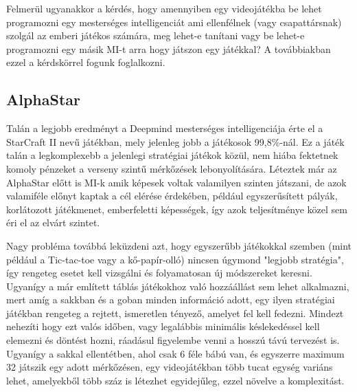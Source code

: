 Felmerül ugyanakkor a kérdés, hogy amennyiben egy videojátékba be lehet programozni egy mesterséges intelligenciát ami ellenfélnek (vagy csapattársnak) szolgál az emberi játékos számára, meg lehet-e tanítani vagy be lehet-e programozni egy másik MI-t arra hogy játszon egy játékkal? A továbbiakban ezzel a kérdskörrel fogunk foglalkozni.


\subsection{AlphaStar}
Talán a legjobb eredményt a Deepmind mesterséges intelligenciája érte el a StarCraft II nevű játékban, mely jelenleg jobb a játékosok 99,8\%-nál. 
Ez a játék talán a legkomplexebb a jelenlegi stratégiai játékok közül, nem hiába fektetnek komoly pénzeket a verseny szintű mérkőzések lebonyolítására.
Léteztek már az AlphaStar előtt is MI-k amik képesek voltak valamilyen szinten játszani, de azok valamiféle előnyt kaptak a cél elérése érdekében, például egyszerűsített pályák, korlátozott játékmenet, emberfeletti képességek, így azok teljesítménye közel sem éri el az elvárt szintet.

Nagy probléma továbbá leküzdeni azt, hogy egyszerűbb játékokkal szemben (mint például a Tic-tac-toe vagy a kő-papír-olló) nincsen úgymond "legjobb stratégia", így rengeteg esetet kell vizsgálni és folyamatosan új módszereket keresni. Ugyanígy a már említett táblás játékokhoz való hozzáállást sem lehet alkalmazni, mert amíg a sakkban és a goban minden információ adott, egy ilyen stratégiai játékban rengeteg a rejtett, ismeretlen tényező, amelyet fel kell fedezni. Mindezt nehezíti hogy ezt valós időben, vagy legalábbis minimális késlekedéssel kell elemezni és döntést hozni, ráadásul figyelembe venni a hosszú távú tervezést is. Ugyanígy a sakkal ellentétben, ahol csak 6 féle bábú van, és egyszerre maximum 32 játszik egy adott mérkőzésen, egy videojátékban több tucat egység variáns lehet, amelyekből több száz is létezhet egyidejűleg, ezzel növelve a komplexitást.

